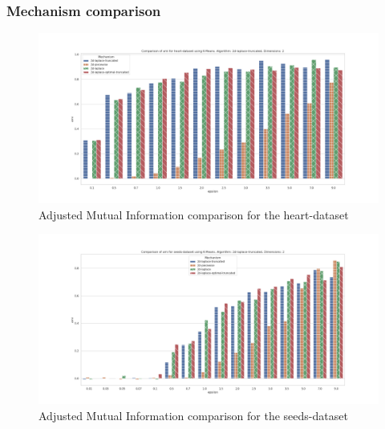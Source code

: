 \subsubsection*{Mechanism comparison}
\begin{figure}[H]
    \includegraphics[width=1\textwidth]{Results/RQ1/heart-dataset/ami_heart-dataset_comparison.png}
    \caption{Adjusted Mutual Information comparison for the heart-dataset}
    \label{fig:ami_heart-dataset_comparison_2d}
\end{figure}
\begin{figure}[H]
    \includegraphics[width=1\textwidth]{Results/RQ1/seeds-dataset/ami_seeds-dataset_comparison.png}
    \caption{Adjusted Mutual Information comparison for the seeds-dataset}
    \label{fig:ami_seeds-dataset_comparison_2d}
\end{figure}
